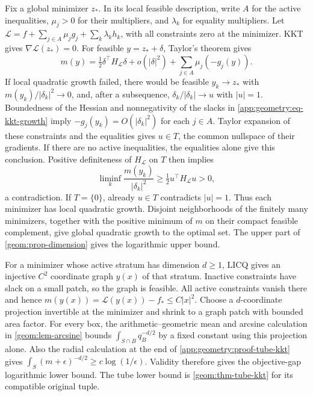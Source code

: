 Fix a global minimizer $z_*$. In its local feasible description, write
$A$ for the active inequalities, $\mu_j>0$ for their multipliers,
and $\lambda_k$ for equality multipliers. Let
$\mathcal L=f+\sum_{j\in A}\mu_jg_j+\sum_k\lambda_k h_k$, with all
constraints zero at the minimizer. KKT gives $\nabla\mathcal L(z_*)=0$.
For feasible $y=z_*+\delta$, Taylor's theorem gives
\begin{equation}\label{app:geometry:eq-kkt-growth}
 m(y)=\tfrac12\delta^\top H_{\mathcal L}\delta+o(|\delta|^2)
                              +\sum_{j\in A}\mu_j(-g_j(y)).
\end{equation}
If local quadratic growth failed, there would be feasible $y_k\to z_*$
with $m(y_k)/|\delta_k|^2\to0$, and, after a subsequence,
$\delta_k/|\delta_k|\to u$ with $|u|=1$. Boundedness of the Hessian and
nonnegativity of the slacks in \cref{app:geometry:eq-kkt-growth} imply
$-g_j(y_k)=O(|\delta_k|^2)$ for each $j\in A$.
Taylor expansion of these constraints and the equalities gives
$u\in T$, the common nullspace of their gradients. If there are no
active inequalities, the equalities alone give this conclusion.
Positive definiteness of $H_{\mathcal L}$ on $T$ then implies
\[
 \liminf_k\frac{m(y_k)}{|\delta_k|^2}
            \geq\tfrac12 u^\top H_{\mathcal L}u>0,
\]
a contradiction. If $T=\{0\}$, already $u\in T$ contradicts $|u|=1$.
Thus each minimizer has local quadratic growth. Disjoint neighborhoods
of the finitely many minimizers, together with the positive minimum of
$m$ on their compact feasible complement, give global quadratic growth
to the optimal set. The upper part of \cref{geom:prop-dimension} gives
the logarithmic upper bound.

For a minimizer whose active stratum has dimension $d\geq1$, LICQ
gives an injective $C^2$ coordinate graph $y(x)$ of that stratum.
Inactive constraints have slack on a small patch, so the graph is
feasible. All active constraints vanish there and hence
$m(y(x))=\mathcal L(y(x))-f_*\leq C|x|^2$. Choose a $d$-coordinate
projection invertible at the minimizer and shrink to a graph patch
with bounded area factor. For every box, the arithmetic--geometric
mean and arcsine calculation in \cref{geom:lem-arcsine} bounds
$\int_{S\cap B}q_B^{-d/2}$ by a fixed constant using this projection
alone. Also the radial calculation at the end of
\cref{app:geometry:proof-tube-kkt} gives
$\int_S(m+\epsilon)^{-d/2}\geq c\log(1/\epsilon)$.
Validity therefore gives the objective-gap logarithmic lower bound.
The tube lower bound is \cref{geom:thm-tube-kkt} for its compatible
original tuple.

